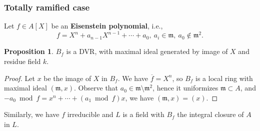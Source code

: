 \documentclass{article}
\theoremstyle{definition}
\newtheorem{proposition}{Proposition}[section]
\theoremstyle{remark}
\renewcommand{\bar}{\overline}
\begin{document}
\subsubsection*{Totally ramified case}
Let $f\in A[X]$ be an \textbf{Eisenstein polynomial}, i.e., \[f = X^n + a_{n-1}X^{n-1} + \cdots  + a_0,\ a_i\in\mathfrak{m},\ a_0\notin\mathfrak{m}^2.\]
\begin{proposition}
    $B_f$ is a DVR, with maximal ideal generated by image of $X$ and residue field $k$.
\end{proposition}
\begin{proof}
    Let $x$ be the image of $X$ in $B_f$.
    We have $\bar{f} = X^n$, so $B_f$ is a local ring with maximal ideal $(\mathfrak{m}, x)$.
    Observe that $a_0\in\mathfrak{m\setminus m^2}$, hence it uniformizes $\mathfrak{m}\subset A$, and $-a_0\bmod f = x^n + \cdots + (a_1\bmod f)x$, we have $(\mathfrak{m}, x) = (x)$.
\end{proof}
Similarly, we have $f$ irreducible and $L$ is a field with $B_f$ the integral closure of $A$ in $L$.
\end{document}
